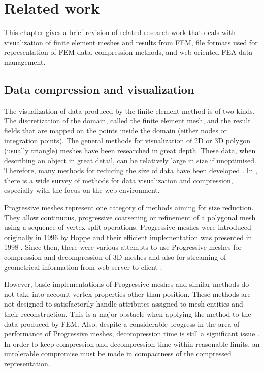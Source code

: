 \chapter{Related work}
\label{chapter:related-work}


This chapter gives a brief revision of related research work that deals with visualization of finite element meshes and results from FEM, file formats used for representation of FEM data, compression methods, and web-oriented FEA data management.


\section{Data compression and visualization}

The visualization of data produced by the finite element method is of two kinds. The discretization of the domain, called the finite element mesh, and the result fields that are mapped on the points inside the domain (either nodes or integration points). The general methods for visualization of 2D or 3D polygon (usually triangle) meshes have been researched in great depth. These data, when describing an object in great detail, can be relatively large in size if unoptimised. Therefore, many methods for reducing the size of data have been developed \cite{Alliez2005}. In \cite{Evans2014}, there is a wide survey of methods for data visualization and compression, especially with the focus on the web environment.

Progressive meshes represent one category of methods aiming for size reduction. They allow continuous, progressive coarsening or refinement of a polygonal mesh using a sequence of vertex-split operations. Progressive meshes were introduced originally in 1996 by Hoppe \cite{Hoppe1996} and their efficient implementation was presented in 1998 \cite{Hoppe1998}. Since then, there were various attempts to use Progressive meshes for compression and decompression of 3D meshes \cite{Gudukbay2002, Valette2004, Valette2009, Lavoue2013} and also for streaming of geometrical information from web server to client \cite{Alliez2001, Maglo2012}.

However, basic implementations of Progressive meshes and similar methods do not take into account vertex properties other than position. These methods are not designed to satisfactorily handle attributes assigned to mesh entities and their reconstruction. This is a major obstacle when applying the method to the data produced by FEM. Also, despite a considerable progress in the area of performance of Progressive meshes, decompression time is still a significant issue \cite{Limper2013}. In order to keep compression and decompression time within reasonable limits, an untolerable compromise must be made in compactness of the compressed representation.

